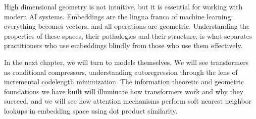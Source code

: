 High dimensional geometry is not intuitive, but it is essential for working with modern AI systems. Embeddings are the lingua franca of machine learning: everything becomes vectors, and all operations are geometric. Understanding the properties of these spaces, their pathologies and their structure, is what separates practitioners who use embeddings blindly from those who use them effectively.

In the next chapter, we will turn to models themselves. We will see transformers as conditional compressors, understanding autoregression through the lens of incremental codelength minimization. The information theoretic and geometric foundations we have built will illuminate how transformers work and why they succeed, and we will see how attention mechanisms perform soft nearest neighbor lookups in embedding space using dot product similarity.